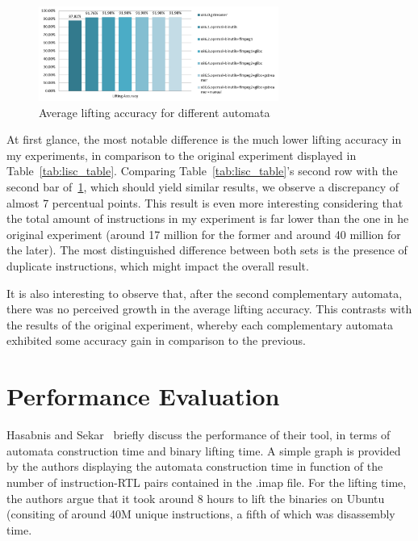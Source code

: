 \documentclass[12pt]{article}
\begin{document}
\begin{figure}[ht]
\centering
\includegraphics[width=0.7\textwidth]{lifting_results}%
\caption{Average lifting accuracy for different automata}
\label{fig:lifting_accuracy}
\end{figure}

At first glance, the most notable difference is the much lower lifting accuracy in my experiments, in comparison to the original experiment displayed in Table~\ref{tab:lisc_table}. Comparing Table~\ref{tab:lisc_table}'s second row with the second bar of~\ref{fig:lifting_accuracy}, which should yield similar results, we observe a discrepancy of almost 7 percentual points. This result is even more interesting considering that the total amount of instructions in my experiment is far lower than the one in he original experiment (around 17 million for the former and around 40 million for the later). The most distinguished difference between both sets is the presence of duplicate instructions, which might impact the overall result.

It is also interesting to observe that, after the second complementary automata, there was no perceived growth in the average lifting accuracy. This contrasts with the results of the original experiment, whereby each complementary automata exhibited some accuracy gain in comparison to the previous.


\section{Performance Evaluation} \label{sec:performance}

Hasabnis and Sekar~\cite{Hasabnis2014} briefly discuss the performance of their tool, in terms of automata construction time and binary lifting time. A simple graph is provided by the authors displaying the automata construction time in function of the number of instruction-RTL pairs contained in the .imap file. For the lifting time, the authors argue that it took around 8 hours to lift the binaries on Ubuntu (consiting of around 40M unique instructions, a fifth of which was disassembly time.
\end{document}
